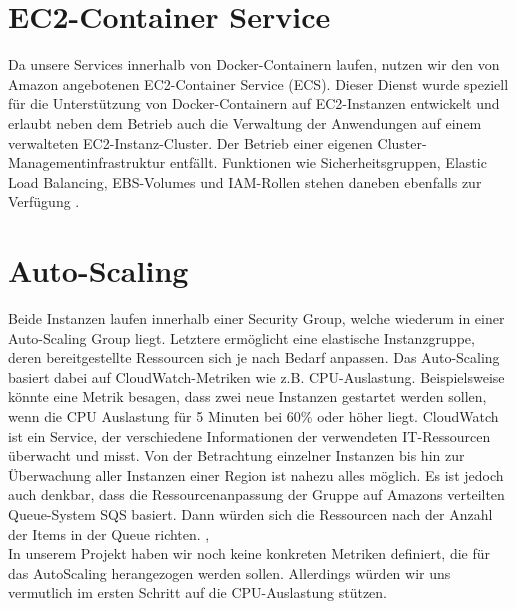 \section{EC2-Container Service}
\label{sec:ecs}
Da unsere Services innerhalb von Docker-Containern laufen, nutzen wir den von Amazon angebotenen EC2-Container Service (ECS). Dieser Dienst wurde speziell für die Unterstützung von Docker-Containern auf EC2-Instanzen entwickelt und erlaubt neben dem Betrieb auch die Verwaltung der Anwendungen auf einem verwalteten EC2-Instanz-Cluster. Der Betrieb einer eigenen Cluster-Managementinfrastruktur entfällt. Funktionen wie Sicherheitsgruppen, Elastic Load Balancing, EBS-Volumes und IAM-Rollen stehen daneben ebenfalls zur Verfügung \cite{aws:ecs}.

\section{Auto-Scaling}
\label{sec:auto-scaling}
Beide Instanzen laufen innerhalb einer Security Group, welche wiederum in einer Auto-Scaling Group liegt. Letztere ermöglicht eine elastische Instanzgruppe, deren bereitgestellte Ressourcen sich je nach Bedarf anpassen. Das Auto-Scaling basiert dabei auf CloudWatch-Metriken wie z.B. CPU-Auslastung. Beispielsweise könnte eine Metrik besagen, dass zwei neue Instanzen gestartet werden sollen, wenn die CPU Auslastung für 5 Minuten bei 60\% oder höher liegt. CloudWatch ist ein Service, der verschiedene Informationen der verwendeten IT-Ressourcen überwacht und misst. Von der Betrachtung einzelner Instanzen bis hin zur Überwachung aller Instanzen einer Region ist nahezu alles möglich. Es ist jedoch auch denkbar, dass die Ressourcenanpassung der Gruppe auf Amazons verteilten Queue-System SQS basiert. Dann würden sich die Ressourcen nach der Anzahl der Items in der Queue richten. \cite{vliet:resilience}, \cite{vliet:programmingec2} \\

In unserem Projekt haben wir noch keine konkreten Metriken definiert, die für das AutoScaling herangezogen werden sollen. Allerdings würden wir uns vermutlich im ersten Schritt auf die CPU-Auslastung stützen.

